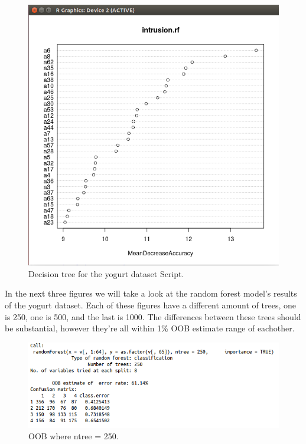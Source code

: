 \documentclass[12pt, letterpaper]{article}
\begin{document}
\begin{figure}[H]
\centering
\includegraphics[width=5.0in]{yogurtplot6}
\caption{Decision tree for the yogurt dataset Script.}
\label{fig:dtcd}
\end{figure}

In the next three figures we will take a look at the random forest model's results of the yogurt dataset. Each of these figures have a different amount of trees, one is 250, one is 500, and the last is 1000. The differences between these trees should be substantial, however they're all within 1\% OOB estimate range of eachother.

\begin{figure}[H]
\centering
\includegraphics[width=5.0in]{yogurtOOB250}
\caption{OOB where ntree = 250.}
\label{fig:oob1}
\end{figure}
\end{document}
